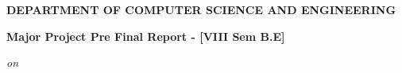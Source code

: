 
\begin{titlingpage}

\thispagestyle{empty}
\centering

\setlength{\toptafiddle}{1in}
\setlength{\bottafiddle}{1in}

\vspace*{-0.75in}
\enlargethispage{\toptafiddle}

\vfill
\begin{LARGE}
	\textbf{\textcolor{thered}{DEPARTMENT OF COMPUTER SCIENCE AND ENGINEERING}}\\
\end{LARGE}
\vfill




	\vfill
		\Huge{\textbf{\textcolor{therablue}{Major Project Pre Final Report - [VIII Sem B.E]}}}
	\vfill



\begin{small}
	\emph{on}
\end{small}


\end{titlingpage}

